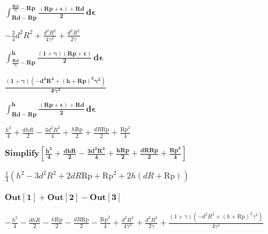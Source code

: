 \documentclass[unicode]{ctexart}
\begin{document}
\begin{doublespace}
\noindent\(\pmb{\text{}}\)
\end{doublespace}

\begin{doublespace}
\noindent\(\pmb{\pmb{\int_{R d-\text{Rp}}^{\frac{R d}{\gamma }-\text{Rp}} \frac{(\text{Rp}+\epsilon )+R d}{2} \, d\epsilon }}\)
\end{doublespace}

\begin{doublespace}
\noindent\(-\frac{3}{4} d^2 R^2+\frac{d^2 R^2}{4 \gamma ^2}+\frac{d^2 R^2}{2 \gamma }\)
\end{doublespace}

\begin{doublespace}
\noindent\(\pmb{\int_{\frac{R d}{\gamma }-\text{Rp}}^h \frac{(1+\gamma )(\text{Rp}+\epsilon )}{2} \, d\epsilon }\)
\end{doublespace}

\begin{doublespace}
\noindent\(\pmb{\frac{(1+\gamma ) \left(-d^2 R^2+(h+\text{Rp})^2 \gamma ^2\right)}{4 \gamma ^2}}\)
\end{doublespace}

\begin{doublespace}
\noindent\(\pmb{\int_{R d-\text{Rp}}^h \frac{(\text{Rp}+\epsilon )+R d}{2} \, d\epsilon }\)
\end{doublespace}

\begin{doublespace}
\noindent\(\frac{h^2}{4}+\frac{d h R}{2}-\frac{3 d^2 R^2}{4}+\frac{h \text{Rp}}{2}+\frac{d R \text{Rp}}{2}+\frac{\text{Rp}^2}{4}\)
\end{doublespace}

\begin{doublespace}
\noindent\(\pmb{\text{Simplify}\left[\frac{h^2}{4}+\frac{d h R}{2}-\frac{3 d^2 R^2}{4}+\frac{h \text{Rp}}{2}+\frac{d R \text{Rp}}{2}+\frac{\text{Rp}^2}{4}\right]}\)
\end{doublespace}

\begin{doublespace}
\noindent\(\frac{1}{4} \left(h^2-3 d^2 R^2+2 d R \text{Rp}+\text{Rp}^2+2 h (d R+\text{Rp})\right)\)
\end{doublespace}

\begin{doublespace}
\noindent\(\pmb{\text{Out}[1]+\text{Out}[2]-\text{Out}[3]}\)
\end{doublespace}

\begin{doublespace}
\noindent\(-\frac{h^2}{4}-\frac{d h R}{2}-\frac{h \text{Rp}}{2}-\frac{d R \text{Rp}}{2}-\frac{\text{Rp}^2}{4}+\frac{d^2 R^2}{4 \gamma ^2}+\frac{d^2
R^2}{2 \gamma }+\frac{(1+\gamma ) \left(-d^2 R^2+(h+\text{Rp})^2 \gamma ^2\right)}{4 \gamma ^2}\)
\end{doublespace}
\end{document}
